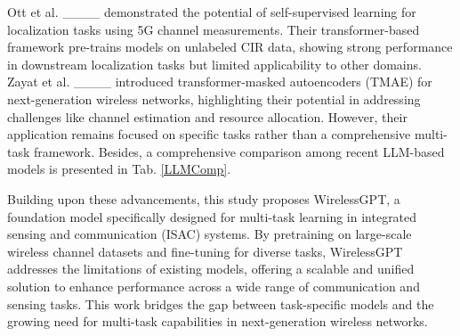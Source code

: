 Ott et al. ____ demonstrated the potential of self-supervised learning for localization tasks using 5G channel measurements. Their transformer-based framework pre-trains models on unlabeled CIR data, showing strong performance in downstream localization tasks but limited applicability to other domains. Zayat et al. ____ introduced transformer-masked autoencoders (TMAE) for next-generation wireless networks, highlighting their potential in addressing challenges like channel estimation and resource allocation. However, their application remains focused on specific tasks rather than a comprehensive multi-task framework. Besides, a comprehensive comparison among recent LLM-based models is presented in Tab. \ref{LLMComp}.


Building upon these advancements, this study proposes WirelessGPT, a foundation model specifically designed for multi-task learning in integrated sensing and communication (ISAC) systems. By pretraining on large-scale wireless channel datasets and fine-tuning for diverse tasks, WirelessGPT addresses the limitations of existing models, offering a scalable and unified solution to enhance performance across a wide range of communication and sensing tasks. This work bridges the gap between task-specific models and the growing need for multi-task capabilities in next-generation wireless networks.